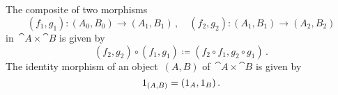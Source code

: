 \subsection{}

The composite of two morphisms
\[
	(f_1, g_1) \colon (A_0, B_0) \to (A_1, B_1) \,,
	\quad
	(f_2, g_2) \colon (A_1, B_1) \to (A_2, B_2)
\]
in~$\cat{A} × \cat{B}$ is given by
\[
	(f_2, g_2) ∘ (f_1, g_1)
	≔
	(f_2 ∘ f_1, g_2 ∘ g_1) \,.
\]
The identity morphism of an object~$(A, B)$ of~$\cat{A} × \cat{B}$ is given by
\[
	1_{(A, B)}
	=
	(1_A, 1_B) \,.
\]
